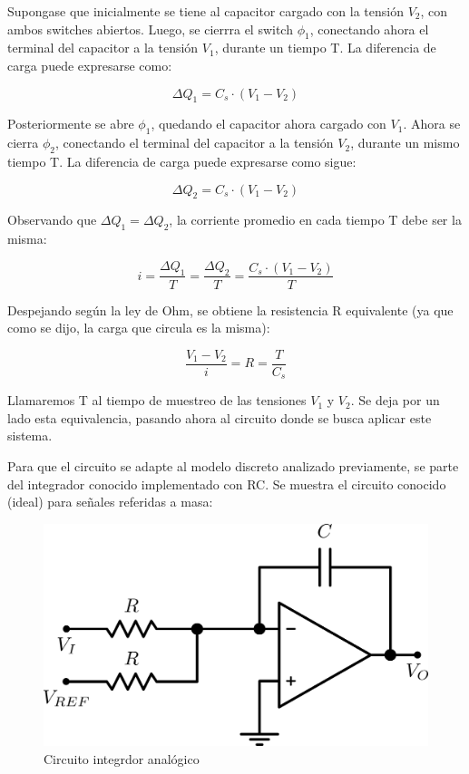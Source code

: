 \documentclass[assd_tp3_main.tex]{subfiles}
\begin{document}
Supongase que inicialmente se tiene al capacitor cargado con la tensión $V_2$, con ambos switches abiertos. Luego, se cierrra el switch $\phi_1$, conectando ahora el terminal del capacitor a la tensión $V_1$, durante un tiempo T. La diferencia de carga puede expresarse como:

\[
\Delta Q_1 = C_s \cdot (V_1 - V_2)
\]

Posteriormente se abre $\phi_1$, quedando el capacitor ahora cargado con $V_1$. Ahora se cierra $\phi_2$, conectando el terminal del capacitor a la tensión $V_2$, durante un mismo tiempo T. La diferencia de carga puede expresarse como sigue:

\[
\Delta Q_2 = C_s \cdot (V_1 - V_2)
\]

Observando que $\Delta Q_1 = \Delta Q_2$, la corriente promedio en cada tiempo T debe ser la misma:

\[
i = \frac{\Delta Q_1}{T} = \frac{\Delta Q_2}{T} = \frac{C_s \cdot (V_1 - V_2)}{T}
\]

Despejando según la ley de Ohm, se obtiene la resistencia R equivalente (ya que como se dijo, la carga que circula es la misma):

\[
\frac{V_1 - V_2}{i} = R = \frac{T}{C_s}
\]

Llamaremos T al tiempo de muestreo de las tensiones $V_1$ y $V_2$. Se deja por un lado esta equivalencia, pasando ahora al circuito donde se busca aplicar este sistema.\par 
Para que el circuito se adapte al modelo discreto analizado previamente, se parte del integrador conocido implementado con RC. Se muestra el circuito conocido (ideal) para señales referidas a masa:

\begin{figure}[!ht]
\begin{centering}
\includegraphics[scale=0.5]{images/ej5/IntegradorBasico.png}
\par\end{centering}
\caption{Circuito integrdor analógico}
\end{figure}
\end{document}
